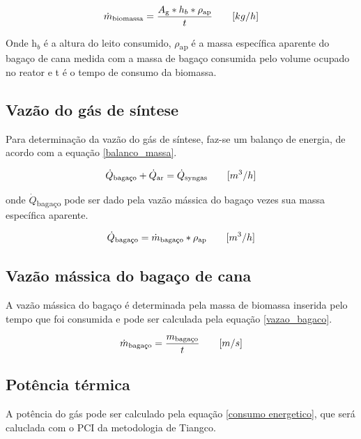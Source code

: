 \begin{equation} \label{vazao_biomassa_PCI}
\dot{m}\textsubscript{biomassa} = \frac{A\textsubscript{g} * h_b * \rho\textsubscript{ap}}{t} \qquad [kg/h]
\end{equation}

Onde
h$_b$ é a altura do leito consumido,
$\rho$\textsubscript{ap} é a massa específica aparente do bagaço de cana medida com a massa de bagaço consumida pelo volume ocupado no reator e
t é o tempo de consumo da biomassa.

\subsection{Vazão do gás de síntese}

Para determinação da vazão do gás de síntese, faz-se um balanço de energia, de acordo com a equação \ref{balanco_massa}.

\begin{equation}\label{balanco_massa}
	\dot{Q}\textsubscript{bagaço} + \dot{Q}\textsubscript{ar} = \dot{Q}\textsubscript{syngas}\qquad [m^3/h]
\end{equation}

onde $\dot{Q}$\textsubscript{bagaço} pode ser dado pela vazão mássica do bagaço vezes sua massa específica aparente.

\begin{equation} \label{qdot_bagaco}
	\dot{Q}\textsubscript{bagaço} = \dot{m}\textsubscript{bagaço} * \rho\textsubscript{ap} \qquad [m^3/h]
\end{equation}

\subsection{Vazão mássica do bagaço de cana}

A vazão mássica do bagaço é determinada pela massa de biomassa inserida pelo tempo que foi consumida e pode ser calculada pela equação \ref{vazao_bagaco}.

\begin{equation} \label{vazao_bagaco}
\dot{m}\textsubscript{bagaço} = \frac{m\textsubscript{bagaço}}{t} \qquad [m/s]
\end{equation}

\subsection{Potência térmica}

A potência do gás pode ser calculado pela equação \ref{consumo energetico}, que será caluclada com o PCI da metodologia de Tiangco.

